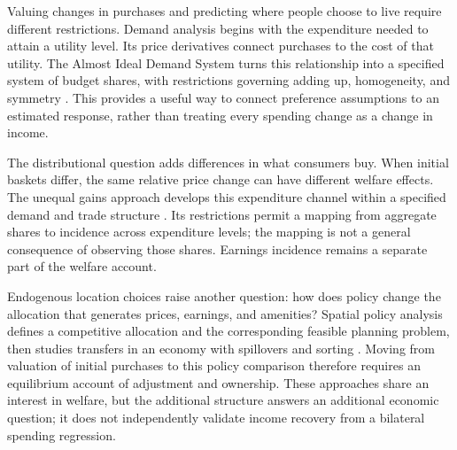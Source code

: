 Valuing changes in purchases and predicting where people choose to live require
different restrictions. Demand analysis begins with the expenditure needed to
attain a utility level. Its price derivatives connect purchases to the cost of
that utility. The Almost Ideal Demand System turns this relationship into a
specified system of budget shares, with restrictions governing adding up,
homogeneity, and symmetry \cite{deaton_muellbauer_1980}. This provides a useful
way to connect preference assumptions to an estimated response, rather than
treating every spending change as a change in income.

The distributional question adds differences in what consumers buy. When initial
baskets differ, the same relative price change can have different welfare effects.
The unequal gains approach develops this expenditure channel within a specified
demand and trade structure \cite{fajgelbaum_khandelwal_2016}. Its restrictions
permit a mapping from aggregate shares to incidence across expenditure levels;
the mapping is not a general consequence of observing those shares. Earnings
incidence remains a separate part of the welfare account.

Endogenous location choices raise another question: how does policy change the
allocation that generates prices, earnings, and amenities? Spatial policy analysis
defines a competitive allocation and the corresponding feasible planning problem,
then studies transfers in an economy with spillovers and sorting
\cite{fajgelbaum_gaubert_2020}. Moving from valuation of initial purchases to this
policy comparison therefore requires an equilibrium account of adjustment and
ownership. These approaches share an interest in welfare, but the additional
structure answers an additional economic question; it does not independently
validate income recovery from a bilateral spending regression.
